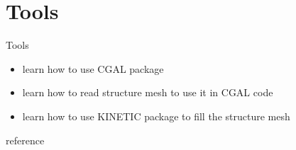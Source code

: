 \documentclass[10pt]{beamer}
\begin{document}
\section{Tools}

\begin{frame}[plain]{Tools}
    \begin{itemize}
        \item learn how to use CGAL package
        \item learn how to read structure mesh to use it in CGAL code
        \item learn how to use KINETIC package to fill the structure mesh  
    \end{itemize}
\end{frame}
\begin{frame}{reference}
    \nocite{*}
    
    
\end{frame}
\end{document}

